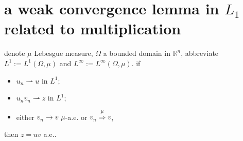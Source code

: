 \section{a weak convergence lemma in \texorpdfstring{$L_1$}{} related to multiplication}

\begin{lemma}
denote $\mu$ Lebesgue measure, $\Omega$ a bounded domain in $\mathbb{R}^n$, abbreviate $L^1:= L^1(\Omega, \mu)$ and $L^\infty:= L^\infty(\Omega, \mu)$. if 
\begin{itemize}
\item $u_n\rightharpoonup u$ in $L^1$;
\item $u_nv_n\rightharpoonup z$ in $L^1$;
\item either $v_n\rightarrow v$ $\mu$-a.e.  or $v_n\stackrel{\mu}{\Longrightarrow}v$,
\end{itemize}
then $z = uv$ a.e..
\end{lemma}
